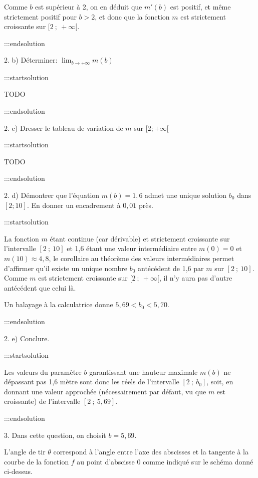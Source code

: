 \documentclass{cornouaille}
\begin{document}
Comme $b$ est supérieur à 2, on en déduit que $m'(b)$ est positif, et même strictement positif pour $b>2$, et donc que la fonction $m$ est strictement croissante sur $[2~;~+\infty[$.


:::endsolution


2. b)  Déterminer: $\lim_{b \to +\infty} m(b)$


:::startsolution

TODO


:::endsolution


2. c)  Dresser le tableau de variation de $m$ sur $[2;+\infty[$


:::startsolution

TODO


:::endsolution



2. d)  Démontrer que l'équation $m(b)=1,6$ admet une unique solution $b_0$ dans $[2;10]$. En donner un encadrement à $0,01$ près.


:::startsolution

La fonction $m$ étant continue (car dérivable) et strictement croissante sur l'intervalle $[2~;~10]$ et 1,6 étant une valeur intermédiaire entre $m(0) = 0$ et $m(10) \approx 4,8$, le corollaire au théorème des valeurs intermédiaires permet d'affirmer qu'il existe un unique nombre $b_0$ antécédent de 1,6 par $m$ sur $[2~;~10]$. Comme $m$ est strictement croissante sur $[2~;~+\infty[$, il n'y aura pas d'autre antécédent que celui là.

Un balayage à la calculatrice donne $5,69 < b_0 < 5,70$.


:::endsolution


2. e)  Conclure.


:::startsolution


Les valeurs du paramètre $b$ garantissant une hauteur maximale $m(b)$ ne dépassant pas 1,6 mètre sont donc les réels de l'intervalle $[2~;~b_0]$, soit, en donnant une valeur approchée (nécessairement par défaut, vu que $m$ est croissante) de l'intervalle $[2~;~5,69]$.


:::endsolution




\setcounter{enumii}{0}


3.   Dans cette question, on choisit $b = 5,69$.

L'angle de tir $\theta$ correspond à l'angle entre l'axe des abscisses et la tangente à la courbe de la
fonction $f$ au point d'abscisse $0$ comme indiqué sur le schéma donné ci-dessus.
\end{document}

